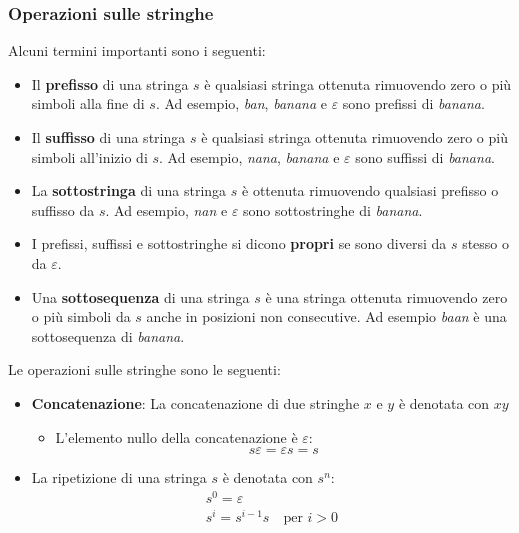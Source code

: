 \documentclass[a4paper]{article}
\begin{document}
\subsubsection{Operazioni sulle stringhe}
\begin{define}
  Alcuni termini importanti sono i seguenti:
  \begin{itemize}
    \item Il \textbf{prefisso} di una stringa \( s \) è qualsiasi stringa ottenuta
      rimuovendo zero o più simboli alla fine di \( s \). Ad esempio, \textit{ban},
      \textit{banana} e \( \varepsilon  \) sono prefissi di \textit{banana}.

    \item Il \textbf{suffisso} di una stringa \( s \) è qualsiasi stringa ottenuta rimuovendo zero o più simboli
      all'inizio di \( s \). Ad esempio,
      \textit{nana}, \textit{banana} e \( \varepsilon  \) sono suffissi di
      \textit{banana}.

    \item La \textbf{sottostringa} di una stringa \( s \) è ottenuta rimuovendo
      qualsiasi prefisso o suffisso da \( s \). Ad esempio, \textit{nan} e
      \( \varepsilon  \) sono sottostringhe di \textit{banana}.

    \item I prefissi, suffissi e sottostringhe si dicono \textbf{propri} se sono
      diversi da \( s \) stesso o da \( \varepsilon  \).

    \item Una \textbf{sottosequenza} di una stringa \( s \) è una stringa ottenuta
      rimuovendo zero o più simboli da \( s \) anche in posizioni non consecutive.
      Ad esempio \textit{baan} è una sottosequenza di \textit{banana}.
  \end{itemize}

  \vspace{2em}
  \noindent
\end{define}

Le operazioni sulle stringhe sono le seguenti:
\begin{itemize}
  \item \textbf{Concatenazione}: La concatenazione di due stringhe \( x \) e \( y \) è
    denotata con \( xy \) 

    \begin{itemize}
      \item L'elemento nullo della concatenazione è \( \varepsilon  \):
        \[
          s \varepsilon  = \varepsilon  s = s
        \] 
    \end{itemize}

  \item La ripetizione di una stringa \( s \) è denotata con \( s^n \):
    \[
      \begin{aligned}
        s^0 = \varepsilon  \\
        s^i = s^{i-1} s \quad \text{per } i > 0
      \end{aligned}
    \] 
\end{itemize}
\end{document}
